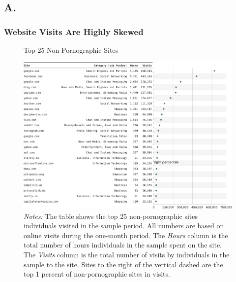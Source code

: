 \documentclass[12pt,twoside]{article}
\begin{document}
\clearpage
\FloatBarrier
\renewcommand{\thetable}{A\arabic{table}}
\renewcommand{\thefigure}{A\arabic{figure}}
\renewcommand{\theequation}{A\arabic{equation}}
\subsection{A. \smATitle{}}\label{sm:smA}

\subsubsection{Website Visits Are Highly Skewed}

\begin{figure}[h]
	\centering
	\caption{Top 25 Non-Pornographic Sites}
	\includegraphics[width=\textwidth]{figs/top_25_nonadultsites.pdf}
	\caption*{\footnotesize \emph{Notes:} 
		The table shows the top 25 non-pornographic sites individuals visited in the sample period.
            All numbers are based on online visits during the one-month period.
		The \emph{Hours} column is the total number of hours individuals in the sample spent on the site. 
		The \emph{Visits} column is the total number of visits by individuals in the sample to the site.  			
		Sites to the right of the vertical dashed are the top 1 percent of non-pornographic sites in visits.
	}
	\label{fig:top25_nonadult}
\end{figure}
\end{document}
